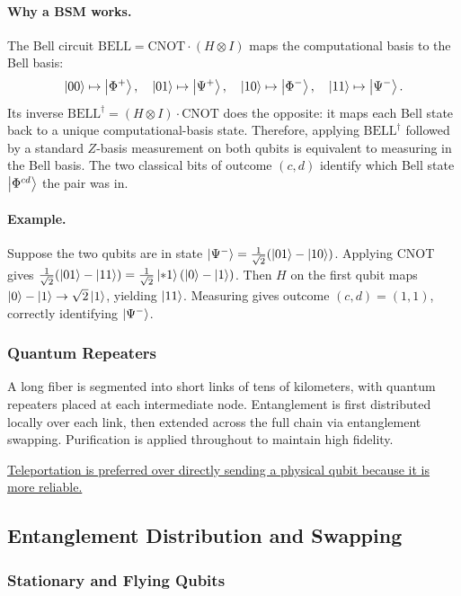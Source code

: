 \documentclass[10pt,a4paper]{article}
\begin{document}
\paragraph{Why a BSM works.}
The Bell circuit $\mathrm{BELL}=\mathrm{CNOT}\cdot(H\otimes I)$ maps the computational basis to the Bell basis:
\[
\ket{00}\mapsto\ket{\Phi^+},\quad \ket{01}\mapsto\ket{\Psi^+},\quad \ket{10}\mapsto\ket{\Phi^-},\quad \ket{11}\mapsto\ket{\Psi^-}.
\]
Its inverse $\mathrm{BELL}^\dagger=(H\otimes I)\cdot\mathrm{CNOT}$ does the opposite: it maps each Bell state back to a unique computational-basis state. Therefore, applying $\mathrm{BELL}^\dagger$ followed by a standard $Z$-basis measurement on both qubits is equivalent to measuring in the Bell basis. The two classical bits of outcome $(c,d)$ identify which Bell state $\ket{\Phi^{cd}}$ the pair was in.

\paragraph{Example.} Suppose the two qubits are in state $\ket{\Psi^-}=\tfrac{1}{\sqrt{2}}(\ket{01}-\ket{10})$. Applying CNOT gives $\tfrac{1}{\sqrt{2}}(\ket{01}-\ket{11})=\tfrac{1}{\sqrt{2}}\ket{*1}(\ket{0}-\ket{1})$. Then $H$ on the first qubit maps $\ket{0}-\ket{1}\to\sqrt{2}\ket{1}$, yielding $\ket{11}$. Measuring gives outcome $(c,d)=(1,1)$, correctly identifying $\ket{\Psi^-}$.

\subsubsection*{Quantum Repeaters}

A long fiber is segmented into short links of tens of kilometers, with quantum repeaters placed at each intermediate node. Entanglement is first distributed locally over each link, then extended across the full chain via entanglement swapping. Purification is applied throughout to maintain high fidelity.

\uline{Teleportation is preferred over directly sending a physical qubit because it is more reliable.}

\subsection{Entanglement Distribution and Swapping}

\subsubsection*{Stationary and Flying Qubits}
\end{document}
